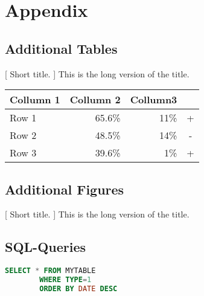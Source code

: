 \appendix
\chapter{Appendix}
\section{Additional Tables}

		\begin{table}[H]
			\centering
			[%
				Short title.%
			]{%
				This is the long version of the title.\footnotemark
			}\label{tbl:sometable}%
			\begin{tabular}{lrrc}%
				Collumn 1         &  Collumn 2 &  Collumn3 &  \\
				\hline
				Row 1             &    65.6\%  &       11\% & +\\
                Row 2             &    48.5\%  &      14\% & -\\
                Row 3             &    39.6\%  &       1\% & +\\
			\end{tabular}
		\end{table}


\pagebreak
\section{Additional Figures}
		\begin{minipage}{\linewidth}%
			[%
				Short title.%
			]{%
				This is the long version of the title.
			}\label{fig:}%
		\end{minipage}


\pagebreak
\section{SQL-Queries}
\begin{center}
	\begin{lstlisting}[caption={SQL Placeholder},captionpos=b,language=SQL]
		SELECT * FROM MYTABLE
		WHERE TYPE=1
		ORDER BY DATE DESC
	\end{lstlisting}
\end{center}

